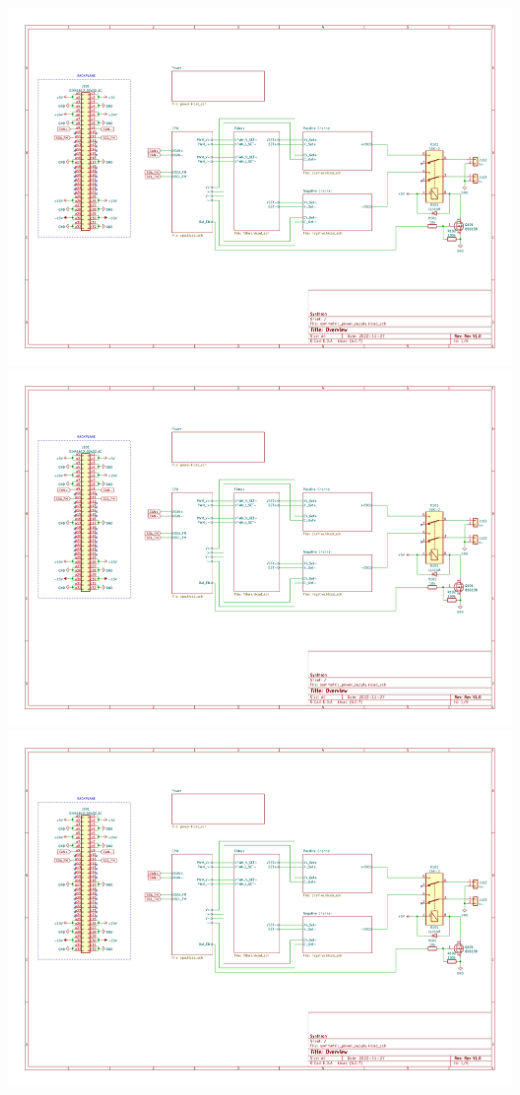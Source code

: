 \documentclass[11pt, a4paper, listof=numbered, captions=tableheading, headinclude, table, xcdraw]{scrreprt}
\begin{document}
\includegraphics[page=4,angle=90,width=\textwidth]{schematics/symmetric_power_supply.pdf}\newpage
\includegraphics[page=5,angle=90,width=\textwidth]{schematics/symmetric_power_supply.pdf}\newpage
\includegraphics[page=6,angle=90,width=\textwidth]{schematics/symmetric_power_supply.pdf}
\end{document}
